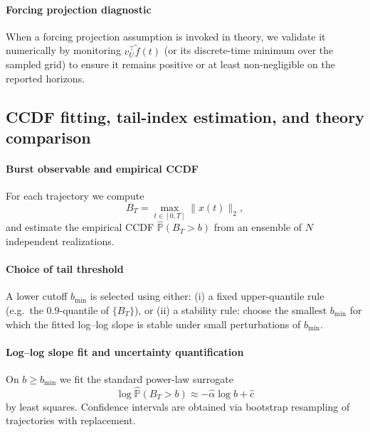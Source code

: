 \documentclass[12pt,a4paper]{article}
\theoremstyle{definition}
\theoremstyle{remark}
\begin{document}
\paragraph{Forcing projection diagnostic}
When a forcing projection assumption is invoked in theory, we validate it numerically by monitoring $v_U^\top \widetilde f(t)$
(or its discrete-time minimum over the sampled grid) to ensure it remains positive or at least non-negligible on the reported horizons.

\subsection{CCDF fitting, tail-index estimation, and theory comparison}
\label{app:ccdf_fitting}

\paragraph{Burst observable and empirical CCDF}
For each trajectory we compute
\[
B_T=\max_{t\in[0,T]}\|x(t)\|_2,
\]
and estimate the empirical CCDF $\widehat{\mathbb{P}}(B_T>b)$ from an ensemble of $N$ independent realizations.

\paragraph{Choice of tail threshold}
A lower cutoff $b_{\min}$ is selected using either:
(i) a fixed upper-quantile rule (e.g.\ the $0.9$-quantile of $\{B_T\}$), or
(ii) a stability rule: choose the smallest $b_{\min}$ for which the fitted log--log slope is stable under small perturbations of $b_{\min}$.

\paragraph{Log--log slope fit and uncertainty quantification}
On $b\ge b_{\min}$ we fit the standard power-law surrogate
\begin{equation}\label{eq:ccdf_slope_fit_app}
	\log \widehat{\mathbb{P}}(B_T>b)\approx -\widehat{\alpha}\log b + \widehat{c}
\end{equation}
by least squares. Confidence intervals are obtained via bootstrap resampling of trajectories with replacement.
\end{document}

